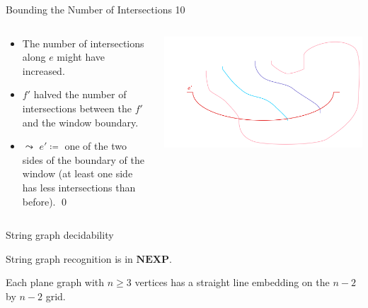 \documentclass[10pt,aspectratio=169]{beamer}
\theoremstyle{plain}
\begin{document}
\begin{frame}{Bounding the Number of Intersections 10}
    \begin{columns}
    \begin{column}{0.35\textwidth}
        \begin{itemize}
            \item The number of intersections along \(e\) might have increased.
            \item<2-> \(f'\) halved the number of intersections between the \(f'\) and the window boundary. 
            \item<3-> \(\leadsto\) \(e' \coloneqq\) one of the two sides of the boundary of the window (at least one side has less intersections than before). \qed
        \end{itemize}
    \end{column}
    \begin{column}{0.65\textwidth}
        \begin{center}
            \includegraphics[width=\textwidth]{images/figure-10.pdf}
        \end{center}
    \end{column}
    \end{columns}
\end{frame}

\begin{frame}{String graph decidability}
    \begin{corollary}
        String graph recognition is in \(\mathbf{NEXP}\).
        \label{cor:decidability}
    \end{corollary}
    \begin{theorem}[Schnyder]
        Each plane graph with \(n \geq 3\) vertices has a straight line embedding on the \(n-2\) by \(n-2\) grid.
    \end{theorem}
\end{frame}
\end{document}
